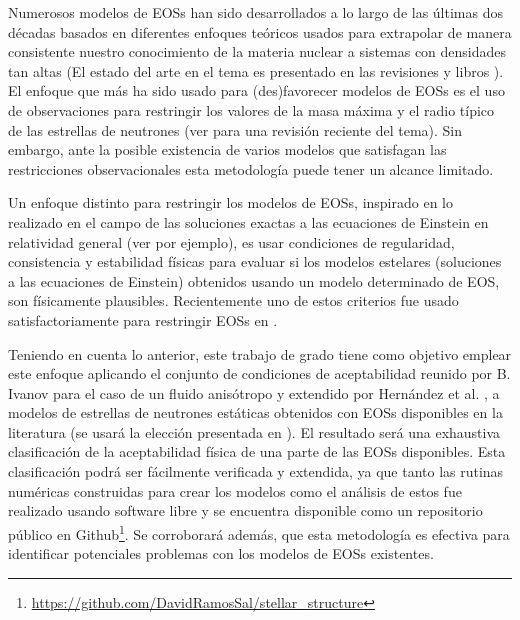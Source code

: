 Numerosos modelos de EOSs han sido desarrollados a lo largo de las últimas dos décadas basados en diferentes enfoques teóricos usados para extrapolar de manera consistente nuestro conocimiento de la materia nuclear a sistemas con densidades tan altas (El estado del arte en el tema es presentado en las revisiones \cite{Ozel2016,Oertel2017} y libros \cite{Haensel2007,Rezzolla2018}). El enfoque que más ha sido usado para (des)favorecer modelos de EOSs es el uso de observaciones para restringir los valores de la masa máxima y el radio típico de las estrellas de neutrones (ver \cite{Lattimer2019} para una revisión reciente del tema). Sin embargo, ante la posible existencia de varios modelos que satisfagan las restricciones observacionales esta metodología puede tener un alcance limitado.   

Un enfoque distinto para restringir los modelos de EOSs, inspirado en lo realizado en el campo de las soluciones exactas a las ecuaciones de Einstein en relatividad general (ver \cite{Delgaty1998} por ejemplo), es usar condiciones de regularidad, consistencia y estabilidad físicas para evaluar si los modelos estelares (soluciones a las ecuaciones de Einstein) obtenidos usando un modelo determinado de EOS, son físicamente plausibles. Recientemente uno de estos criterios fue usado satisfactoriamente para restringir EOSs en \cite{Koliogiannis2019a}.

Teniendo en cuenta lo anterior, este trabajo de grado tiene como objetivo emplear este enfoque aplicando el conjunto de condiciones de aceptabilidad reunido por B. Ivanov \cite{Ivanov2017} para el caso de un fluido anisótropo y extendido por Hernández et al. \cite{Hernandez2018}, a modelos de estrellas de neutrones estáticas obtenidos con EOSs disponibles en la literatura (se usará la elección presentada en \cite{Ozel2016}). El resultado será una exhaustiva clasificación de la aceptabilidad física de una parte de las EOSs disponibles. Esta clasificación podrá ser fácilmente verificada y extendida, ya que tanto las rutinas numéricas construidas para crear los modelos como el análisis de estos fue realizado usando software libre y se encuentra disponible como un repositorio público en Github\footnote{\url{https://github.com/DavidRamosSal/stellar_structure}}. Se corroborará además, que esta metodología es efectiva para identificar potenciales problemas con los modelos de EOSs existentes. 

